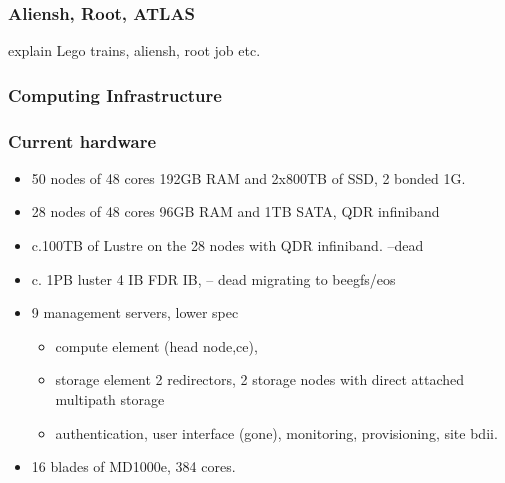 \documentclass{beamer}
\begin{document}
\begin{frame}
    \frametitle{Aliensh, Root, ATLAS}
    explain Lego trains, aliensh, root job etc.
\end{frame}
\begin{frame}
  \frametitle{Computing Infrastructure}
\end{frame}

\begin{frame}
  \frametitle{Current hardware}
  \begin{itemize}
    \item 50 nodes of 48 cores 192GB RAM and 2x800TB of SSD, 2 bonded 1G.
    \item 28 nodes of 48 cores 96GB RAM and 1TB SATA, QDR infiniband
    \item c.100TB of Lustre on the 28 nodes with QDR infiniband. --dead
    \item c. 1PB luster 4 IB FDR IB, -- dead migrating to beegfs/eos
    \item 9 management servers, lower spec
  \begin{itemize}
    \item compute element (head node,ce),
    \item storage element 2 redirectors, 2 storage nodes with direct attached multipath storage
    \item authentication, user interface (gone), monitoring, provisioning, site bdii.
  \end{itemize} 
    \item 16 blades of MD1000e, 384 cores. \color{red}{\bf IB connection}
  \end{itemize}
\end{frame}
\end{document}
